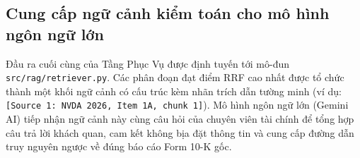 \subsection{Cung cấp ngữ cảnh kiểm toán cho mô hình ngôn ngữ lớn}
Đầu ra cuối cùng của Tầng Phục Vụ được định tuyến tới mô-đun \texttt{src/rag/retriever.py}. Các phân đoạn đạt điểm RRF cao nhất được tổ chức thành một khối ngữ cảnh có cấu trúc kèm nhãn trích dẫn tường minh (ví dụ: \texttt{[Source 1: NVDA 2026, Item 1A, chunk 1]}). Mô hình ngôn ngữ lớn (Gemini AI) tiếp nhận ngữ cảnh này cùng câu hỏi của chuyên viên tài chính để tổng hợp câu trả lời khách quan, cam kết không bịa đặt thông tin và cung cấp đường dẫn truy nguyên ngược về đúng báo cáo Form 10-K gốc.
